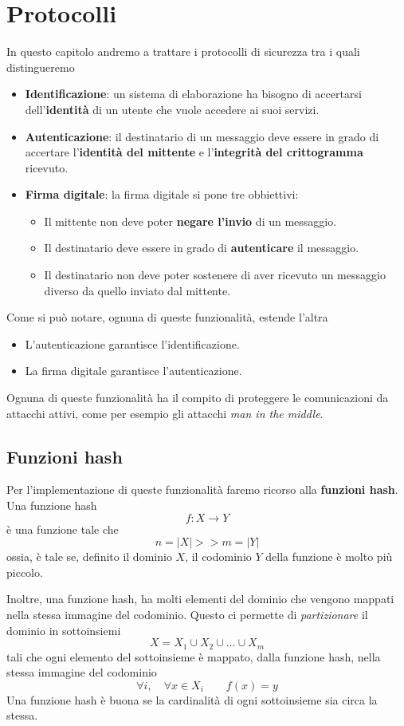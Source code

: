 \chapter{Protocolli}
In questo capitolo andremo a trattare i protocolli di sicurezza tra i quali distingueremo
\begin{itemize}
	\item \textbf{Identificazione}: un sistema di elaborazione ha bisogno di accertarsi dell'\textbf{identit\`a}
	      di un utente che vuole accedere ai suoi servizi.
	\item \textbf{Autenticazione}: il destinatario di un messaggio deve essere in grado di accertare
	      l'\textbf{identit\`a del mittente} e l'\textbf{integrit\`a del crittogramma} ricevuto.
	\item \textbf{Firma digitale}: la firma digitale si pone tre obbiettivi:
	      \begin{itemize}
		      \item Il mittente non deve poter \textbf{negare l'invio} di un messaggio.
		      \item Il destinatario deve essere in grado di \textbf{autenticare} il messaggio.
		      \item Il destinatario non deve poter sostenere di aver ricevuto un messaggio diverso da quello inviato
		            dal mittente.
	      \end{itemize}
\end{itemize}
Come si pu\`o notare, ognuna di queste funzionalit\`a, estende l'altra
\begin{itemize}
	\item L'autenticazione garantisce l'identificazione.
	\item La firma digitale garantisce l'autenticazione.
\end{itemize}
Ognuna di queste funzionalit\`a ha il compito di proteggere le comunicazioni da attacchi attivi, come per esempio
gli attacchi \emph{man in the middle}.

\section{Funzioni hash}
Per l'implementazione di queste funzionalit\`a faremo ricorso alla \textbf{funzioni hash}. Una funzione hash
\[ f : X \rightarrow Y \]
\`e una funzione tale che
\[ n = |X| >> m = |Y| \]
ossia, \`e tale se, definito il dominio $X$, il codominio $Y$ della funzione \`e molto pi\`u piccolo.

Inoltre, una funzione hash, ha molti elementi del dominio che vengono mappati nella stessa immagine del codominio.
Questo ci permette di \emph{partizionare} il dominio in sottoinsiemi
\[ X = X_1 \cup X_2 \cup \dots \cup X_m \]
tali che ogni elemento del sottoinsieme \`e mappato, dalla funzione hash, nella stessa immagine del codominio
\[ \forall i, \quad \forall x \in X_i \quad \quad f(x) = y \]
Una funzione hash \`e buona se la cardinalit\`a di ogni sottoinsieme sia circa la stessa.

